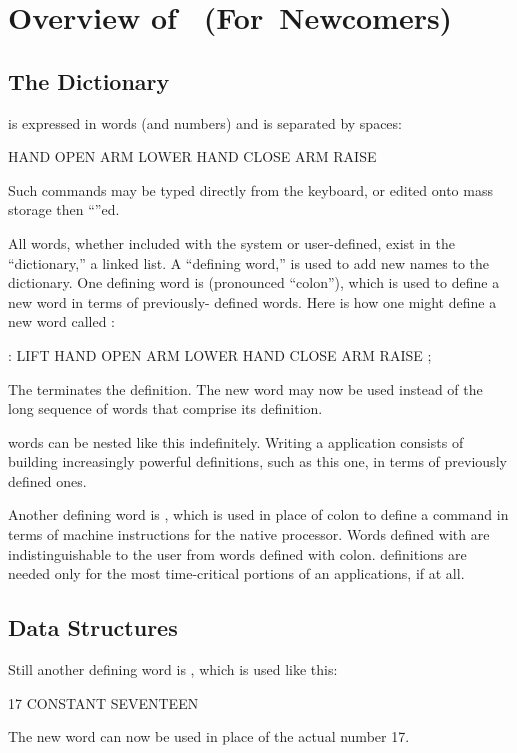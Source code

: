 \appendix{}
\chapter{Overview
of~\Forth{}
(For~Newcomers)}
\section{The Dictionary}%
\Forth{} is expressed in words (and numbers) and is separated by spaces:
\begin{Code}
HAND OPEN  ARM LOWER  HAND CLOSE  ARM RAISE 
\end{Code}
Such commands may be typed directly from the keyboard, or edited onto 
mass storage then ``''ed.

All words, whether included with the system or user-defined,
exist in the ``dictionary,'' a linked list.  A ``defining word,'' is used to add
new names to the dictionary.  One defining word is \forthb{:} (pronounced
``colon''), which is used to define a new word in terms of previously-
defined words.  Here is how one might define a new word called :
\begin{Code}
: LIFT   HAND OPEN  ARM LOWER  HAND CLOSE  ARM RAISE ;
\end{Code}
The \forthb{;} terminates the definition.  The new word  may now be used
instead of the long sequence of words that comprise its definition.

\Forth{} words can be nested like this indefinitely.  Writing a 
\Forth{} application consists of building increasingly powerful definitions,
such as this one, in terms of previously defined ones.

Another defining word is , which is used in place of colon to
define a command in terms of machine instructions for the native processor.
Words defined with  are indistinguishable to the user from 
words defined with colon.   definitions are needed only for the most
time-critical portions of an applications, if at all.
\section{Data Structures}%
%
Still another defining word is , which
is used like this:
\begin{Code}
17 CONSTANT SEVENTEEN
\end{Code}
The new word  can now be used in place of the actual number 17.

